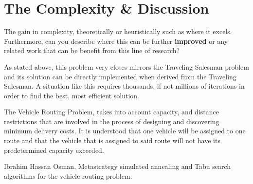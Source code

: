 \documentclass[11pt]{article}
\newcommand{\<}{\langle}
\renewcommand{\>}{\rangle}
\theoremstyle{definition}
\begin{document}
\section{The Complexity \& Discussion}
The gain in complexity, theoretically or heuristically such as where it excels. Furthermore, can you describe where this can be further \textbf{improved} or any related work that can be benefit from this line of research? 


As stated above, this problem very closes mirrors the Traveling Salesman problem and its solution can be directly implemented when derived from the Traveling Salesman. A situation like this requires thousands, if not millions of iterations in order to find the best, most efficient solution. 


The Vehicle Routing Problem, takes into account capacity, and distance restrictions that are involved in the process of designing and discovering minimum delivery costs. It is understood that one vehicle will be assigned to one route and that the vehicle that is assigned to said route will not have its predetermined capacity exceeded. 

\begin{thebibliography}{9}
Ibrahim Hassan Osman,
Metastrategy simulated annealing and Tabu search
algorithms for the vehicle routing problem.
\end{thebibliography}
\end{document}
